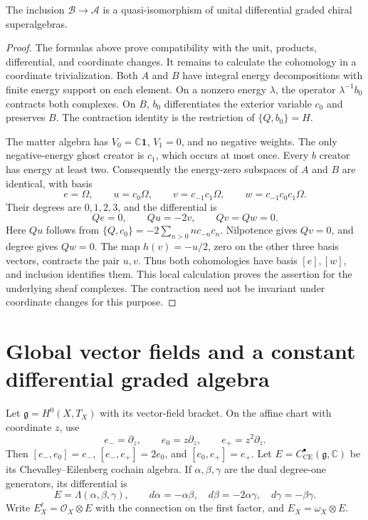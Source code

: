 \begin{proposition}\label{prop:uc-B-qiso}
The inclusion $\mathcal B\longrightarrow\mathcal A$ is a quasi-isomorphism of unital differential graded chiral superalgebras.
\end{proposition}

\begin{proof}
The formulas above prove compatibility with the unit, products, differential, and coordinate changes.
It remains to calculate the cohomology in a coordinate trivialization.
Both $A$ and $B$ have integral energy decompositions with finite energy support on each element.
On a nonzero energy $\lambda$, the operator $\lambda^{-1}b_0$ contracts both complexes.
On $B$, $b_0$ differentiates the exterior variable $c_0$ and preserves $B$.
The contraction identity is the restriction of $\{Q,b_0\}=H$.

The matter algebra has $V_0=\mathbb C\mathbf1$, $V_1=0$, and no negative weights.
The only negative-energy ghost creator is $c_1$, which occurs at most once.
Every $b$ creator has energy at least two.
Consequently the energy-zero subspaces of $A$ and $B$ are identical, with basis
\[
 e=\Omega,\qquad u=c_0\Omega,\qquad
 v=c_{-1}c_1\Omega,\qquad w=c_{-1}c_0c_1\Omega.
\]
Their degrees are $0,1,2,3$, and the differential is
\begin{equation}\label{eq:uc-zeroenergy}
 Qe=0,\qquad Qu=-2v,\qquad Qv=Qw=0.
\end{equation}
Here $Qu$ follows from $\{Q,c_0\}=-2\sum_{n>0}n c_{-n}c_n$.
Nilpotence gives $Qv=0$, and degree gives $Qw=0$.
The map $h(v)=-u/2$, zero on the other three basis vectors, contracts the pair $u,v$.
Thus both cohomologies have basis $[e],[w]$, and inclusion identifies them.
This local calculation proves the assertion for the underlying sheaf complexes.
The contraction need not be invariant under coordinate changes for this purpose.
\end{proof}

\section{Global vector fields and a constant differential graded algebra}

Let $\mathfrak g=H^0(X,T_X)$ with its vector-field bracket.
On the affine chart with coordinate $z$, use
\[
 e_- =\partial_z,\qquad e_0=z\partial_z,\qquad e_+=z^2\partial_z.
\]
Then $[e_-,e_0]=e_-$, $[e_-,e_+]=2e_0$, and $[e_0,e_+]=e_+$.
Let $E=C^\bullet_{\mathrm{CE}}(\mathfrak g,\mathbb C)$ be its Chevalley--Eilenberg cochain algebra.
If $\alpha,\beta,\gamma$ are the dual degree-one generators, its differential is
\begin{equation}\label{eq:uc-E}
 E=\Lambda(\alpha,\beta,\gamma),\qquad
 d\alpha=-\alpha\beta,\quad d\beta=-2\alpha\gamma,\quad
 d\gamma=-\beta\gamma.
\end{equation}
Write $E_X^\ell=\mathcal O_X\otimes E$ with the connection on the first factor, and $E_X=\omega_X\otimes E$.

